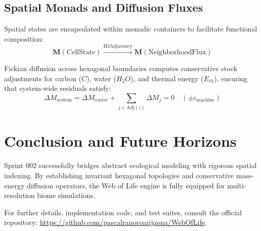 \documentclass[11pt, a4paper]{article}
\begin{document}
\subsection{Spatial Monads and Diffusion Fluxes}
Spatial states are encapsulated within monadic containers to facilitate functional composition:
\begin{equation}
\mathbf{M}(\text{CellState}) \xrightarrow{\text{H3Adjacency}} \mathbf{M}(\text{NeighborhoodFlux})
\end{equation}

Fickian diffusion across hexagonal boundaries computes conservative stock adjustments for carbon ($C$), water ($H_2O$), and thermal energy ($E_{th}$), ensuring that system-wide residuals satisfy:
\begin{equation}
\Delta M_{\text{system}} = \Delta M_{\text{center}} + \sum_{j \in \text{Adj}(i)} \Delta M_{j} = 0 \quad (\pm \epsilon_{\text{machine}})
\end{equation}

\section{Conclusion and Future Horizons}
Sprint 002 successfully bridges abstract ecological modeling with rigorous spatial indexing. By establishing invariant hexagonal topologies and conservative mass-energy diffusion operators, the Web of Life engine is fully equipped for multi-resolution biome simulations. 

For further details, implementation code, and test suites, consult the official repository: \url{https://github.com/pascalranoroarijaona/WebOfLife}.
\end{document}
